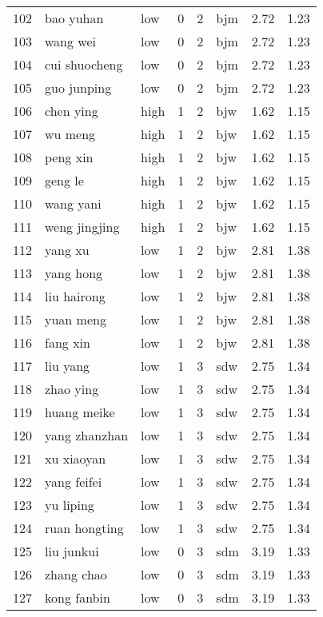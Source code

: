 \begin{table}[ht]
\begin{tabular}{rllrrlrr}
  102 & bao yuhan & low &   0 &   2 & bjm & 2.72 & 1.23 \\ 
  103 & wang wei & low &   0 &   2 & bjm & 2.72 & 1.23 \\ 
  104 & cui shuocheng & low &   0 &   2 & bjm & 2.72 & 1.23 \\ 
  105 & guo junping & low &   0 &   2 & bjm & 2.72 & 1.23 \\ 
  106 & chen ying & high &   1 &   2 & bjw & 1.62 & 1.15 \\ 
  107 & wu meng & high &   1 &   2 & bjw & 1.62 & 1.15 \\ 
  108 & peng xin & high &   1 &   2 & bjw & 1.62 & 1.15 \\ 
  109 & geng le & high &   1 &   2 & bjw & 1.62 & 1.15 \\ 
  110 & wang yani & high &   1 &   2 & bjw & 1.62 & 1.15 \\ 
  111 & weng jingjing & high &   1 &   2 & bjw & 1.62 & 1.15 \\ 
  112 & yang xu & low &   1 &   2 & bjw & 2.81 & 1.38 \\ 
  113 & yang hong & low &   1 &   2 & bjw & 2.81 & 1.38 \\ 
  114 & liu hairong & low &   1 &   2 & bjw & 2.81 & 1.38 \\ 
  115 & yuan meng & low &   1 &   2 & bjw & 2.81 & 1.38 \\ 
  116 & fang xin & low &   1 &   2 & bjw & 2.81 & 1.38 \\ 
  117 & liu yang & low &   1 &   3 & sdw & 2.75 & 1.34 \\ 
  118 & zhao ying & low &   1 &   3 & sdw & 2.75 & 1.34 \\ 
  119 & huang meike & low &   1 &   3 & sdw & 2.75 & 1.34 \\ 
  120 & yang zhanzhan & low &   1 &   3 & sdw & 2.75 & 1.34 \\ 
  121 & xu xiaoyan & low &   1 &   3 & sdw & 2.75 & 1.34 \\ 
  122 & yang feifei & low &   1 &   3 & sdw & 2.75 & 1.34 \\ 
  123 & yu liping & low &   1 &   3 & sdw & 2.75 & 1.34 \\ 
  124 & ruan hongting & low &   1 &   3 & sdw & 2.75 & 1.34 \\ 
  125 & liu junkui & low &   0 &   3 & sdm & 3.19 & 1.33 \\ 
  126 & zhang chao & low &   0 &   3 & sdm & 3.19 & 1.33 \\ 
  127 & kong fanbin & low &   0 &   3 & sdm & 3.19 & 1.33 \\ 

\end{tabular}
\end{table}
